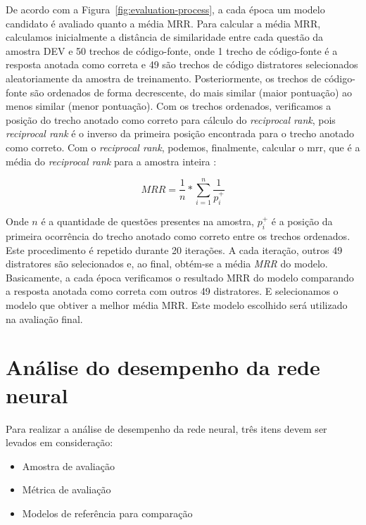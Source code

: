 De acordo com a Figura~\ref{fig:evaluation-process}, a cada época um modelo candidato é avaliado quanto a média MRR. Para calcular a média MRR, calculamos inicialmente a distância de similaridade entre cada questão da amostra DEV e 50 trechos de código-fonte, onde 1 trecho de código-fonte é a resposta anotada como correta e 49 são trechos de código distratores selecionados aleatoriamente da amostra de treinamento.  Posteriormente, os trechos de código-fonte são ordenados de forma decrescente, do mais similar (maior pontuação) ao menos similar (menor pontuação). Com os trechos ordenados, verificamos a posição do trecho anotado como correto para cálculo do \textit{reciprocal rank}, pois \textit{reciprocal rank} é o inverso da primeira posição encontrada para o trecho anotado como correto. Com o \textit{reciprocal rank}, podemos, finalmente, calcular o \acrshort{mrr}, que é a média do \textit{reciprocal rank} para a amostra inteira \citep{Gu-deep-code-search:2018}:

\begin{equation}\label{eq:mrr}
MRR = \frac{1}{n} * \sum_{i = 1}^{n}\frac{1}{p_{i}^{+}}    
\end{equation}

Onde $n$ é a quantidade de questões presentes na amostra, $p_{i}^{+}$ é a posição da primeira ocorrência do trecho anotado como correto entre os trechos ordenados. Este procedimento é repetido durante 20 iterações. A cada iteração, outros 49 distratores são selecionados e, ao final, obtém-se a média \emph{MRR} do modelo. Basicamente, a cada época verificamos o resultado MRR do modelo comparando a resposta anotada como correta com outros 49 distratores. E selecionamos o modelo que obtiver a melhor média MRR. Este modelo escolhido será utilizado na avaliação final.





\section{Análise do desempenho da rede neural}
\label{sec:analise-do-desempenho-da-rede-neural}

Para realizar a análise de desempenho da rede neural, três itens devem ser levados em consideração:

\begin{itemize}
    \item Amostra de avaliação
    \item Métrica de avaliação
    \item Modelos de referência para comparação
\end{itemize}

